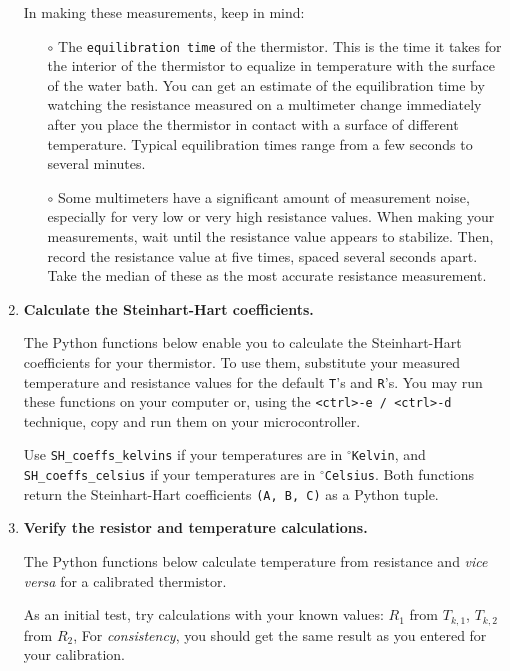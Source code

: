 \begin{enumerate}
	In making these measurements, keep in mind:
	\begin{itemize}
		\item[$\circ$] The \texttt{equilibration time} of the thermistor.
		This is the time it takes for the interior of the thermistor to equalize in temperature with the surface of the water bath.
		You can get an estimate of the equilibration time by watching the resistance measured on a multimeter change immediately after you place the thermistor in contact with a surface of different temperature.
		Typical equilibration times range from a few seconds to several minutes.
		\item[$\circ$] %
		Some multimeters have a significant amount of measurement noise, especially for very low or very high resistance values.
		When making your measurements, wait until the resistance value appears to stabilize.
		Then, record the resistance value at five times, spaced several seconds apart.
		Take the median of these as the most accurate resistance measurement.
	\end{itemize}

	\item \textbf{Calculate the Steinhart-Hart coefficients.}

	The Python functions below enable you to calculate the Steinhart-Hart coefficients for your thermistor.
	To use them, substitute your measured temperature and resistance values for the default \texttt{T}'s and \texttt{R}'s.
	You may run these functions on your computer or, using the \texttt{<ctrl>-e / <ctrl>-d} technique, copy and run them on your microcontroller.

	\smallskip
	Use \lstinline{SH_coeffs_kelvins} if your temperatures are in $^\circ$\texttt{Kelvin}, and \lstinline{SH_coeffs_celsius} if your temperatures are in $^\circ$\texttt{Celsius}. Both functions return the Steinhart-Hart coefficients \lstinline{(A, B, C)} as a Python tuple.
	


	\item \textbf{Verify the resistor and temperature calculations.}

	The Python functions below calculate temperature from resistance and \textit{vice versa} for a calibrated thermistor.
	
	As an initial test, try calculations with your known values: $R_1$ from $T_{k,1}$, $T_{k,2}$ from $R_2$, \etc
	For \emph{consistency}, you should get the same result as you entered for your calibration.


\end{enumerate}
